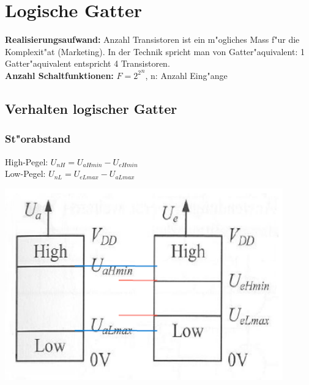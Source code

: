 \section{Logische Gatter}

\textbf{Realisierungsaufwand:} Anzahl Transistoren ist ein m"ogliches Mass f"ur die Komplexit"at (Marketing). In der Technik spricht man von Gatter"aquivalent: 1 Gatter"aquivalent entspricht 4 Transistoren. \\ 
\textbf{Anzahl Schaltfunktionen:} $F= {2^2}^n$, n: Anzahl Eing"ange

\subsection{Verhalten logischer Gatter}
	\begin{minipage}[c]{8 cm}
		\subsubsection{St"orabstand}
			High-Pegel: $ U_{nH} = U_{aHmin} - U_{eHmin} $\\
			Low-Pegel: $ U_{nL} = U_{eLmax} - U_{aLmax} $\\	
			\newline
			\newline
			\newline			
	\end{minipage}	
	\begin{minipage}[c]{6 cm}
		\includegraphics[width=0.9\textwidth]{pics/Pegelbereiche_Stoerabstand}
	\end{minipage}

